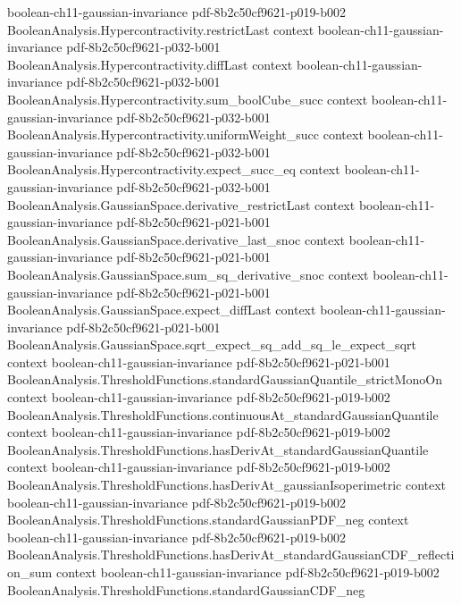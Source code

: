 \begin{theorem}
  {boolean-ch11-gaussian-invariance}
  {pdf-8b2c50cf9621-p019-b002}
\proofstep
  {BooleanAnalysis.Hypercontractivity.restrictLast}
  {context}
  {boolean-ch11-gaussian-invariance}
  {pdf-8b2c50cf9621-p032-b001}
\proofstep
  {BooleanAnalysis.Hypercontractivity.diffLast}
  {context}
  {boolean-ch11-gaussian-invariance}
  {pdf-8b2c50cf9621-p032-b001}
\proofstep
  {BooleanAnalysis.Hypercontractivity.sum_boolCube_succ}
  {context}
  {boolean-ch11-gaussian-invariance}
  {pdf-8b2c50cf9621-p032-b001}
\proofstep
  {BooleanAnalysis.Hypercontractivity.uniformWeight_succ}
  {context}
  {boolean-ch11-gaussian-invariance}
  {pdf-8b2c50cf9621-p032-b001}
\proofstep
  {BooleanAnalysis.Hypercontractivity.expect_succ_eq}
  {context}
  {boolean-ch11-gaussian-invariance}
  {pdf-8b2c50cf9621-p032-b001}
\proofstep
  {BooleanAnalysis.GaussianSpace.derivative_restrictLast}
  {context}
  {boolean-ch11-gaussian-invariance}
  {pdf-8b2c50cf9621-p021-b001}
\proofstep
  {BooleanAnalysis.GaussianSpace.derivative_last_snoc}
  {context}
  {boolean-ch11-gaussian-invariance}
  {pdf-8b2c50cf9621-p021-b001}
\proofstep
  {BooleanAnalysis.GaussianSpace.sum_sq_derivative_snoc}
  {context}
  {boolean-ch11-gaussian-invariance}
  {pdf-8b2c50cf9621-p021-b001}
\proofstep
  {BooleanAnalysis.GaussianSpace.expect_diffLast}
  {context}
  {boolean-ch11-gaussian-invariance}
  {pdf-8b2c50cf9621-p021-b001}
\proofstep
  {BooleanAnalysis.GaussianSpace.sqrt_expect_sq_add_sq_le_expect_sqrt}
  {context}
  {boolean-ch11-gaussian-invariance}
  {pdf-8b2c50cf9621-p021-b001}
\proofstep
  {BooleanAnalysis.ThresholdFunctions.standardGaussianQuantile_strictMonoOn}
  {context}
  {boolean-ch11-gaussian-invariance}
  {pdf-8b2c50cf9621-p019-b002}
\proofstep
  {BooleanAnalysis.ThresholdFunctions.continuousAt_standardGaussianQuantile}
  {context}
  {boolean-ch11-gaussian-invariance}
  {pdf-8b2c50cf9621-p019-b002}
\proofstep
  {BooleanAnalysis.ThresholdFunctions.hasDerivAt_standardGaussianQuantile}
  {context}
  {boolean-ch11-gaussian-invariance}
  {pdf-8b2c50cf9621-p019-b002}
\proofstep
  {BooleanAnalysis.ThresholdFunctions.hasDerivAt_gaussianIsoperimetric}
  {context}
  {boolean-ch11-gaussian-invariance}
  {pdf-8b2c50cf9621-p019-b002}
\proofstep
  {BooleanAnalysis.ThresholdFunctions.standardGaussianPDF_neg}
  {context}
  {boolean-ch11-gaussian-invariance}
  {pdf-8b2c50cf9621-p019-b002}
\proofstep
  {BooleanAnalysis.ThresholdFunctions.hasDerivAt_standardGaussianCDF_reflection_sum}
  {context}
  {boolean-ch11-gaussian-invariance}
  {pdf-8b2c50cf9621-p019-b002}
\proofstep
  {BooleanAnalysis.ThresholdFunctions.standardGaussianCDF_neg}

\end{theorem}
